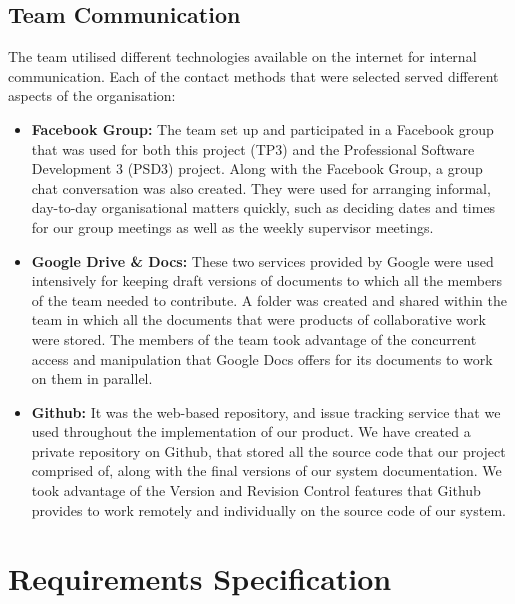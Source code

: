\documentclass{l3proj}
\begin{document}
\section{Team Communication}
\par
The team utilised different technologies available on the internet for internal communication. Each of the contact methods that were selected served different aspects of the organisation:
\\
\begin{itemize}

\item \textbf{Facebook Group:} The team set up and participated in a Facebook group that was used for both this project (TP3) and the Professional Software Development 3 (PSD3) project. Along with the Facebook Group, a group chat conversation was also created. They were used for arranging informal, day-to-day organisational matters quickly, such as deciding dates and times for our group meetings as well as the weekly supervisor meetings.

\item \textbf{Google Drive \& Docs:} These two services provided by Google were used intensively for keeping draft versions of documents to which all the members of the team needed to contribute. A folder was created and shared within the team in which all the documents that were products of collaborative work were stored. The members of the team took advantage of the concurrent access and manipulation that Google Docs offers for its documents to work on them in parallel.

\item \textbf{Github:} It was the web-based repository, and issue tracking service that we used throughout the implementation of our product. We have created a private repository on Github, that stored all the source code that our project comprised of, along with the final versions of our system documentation. We took advantage of the Version and Revision Control features that Github provides to work remotely and individually on the source code of our system.

\end{itemize}
\chapter{Requirements Specification}
\label{requirementsspecification}
\end{document}
